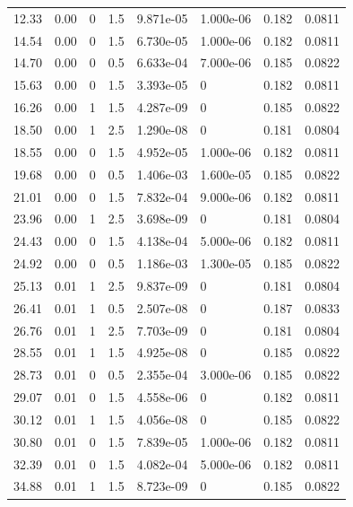 \documentclass[preview]{standalone}
\begin{document}
{{\begin{tabular}{L{1.2cm}C{1.2cm} C{0.3cm}C{0.5cm} C{1.4cm}C{1.4cm} C{1.4cm}C{1.4cm}}
  12.33  &  0.00  & 0     & 1.5 &  9.871e-05  & 1.000e-06  & 0.182 &  0.0811   \\ 
  14.54  &  0.00  & 0     & 1.5 &  6.730e-05  & 1.000e-06  & 0.182 &  0.0811   \\ 
  14.70  &  0.00  & 0     & 0.5 &  6.633e-04  & 7.000e-06  & 0.185 &  0.0822   \\ 
  15.63  &  0.00  & 0     & 1.5 &  3.393e-05  & 0  & 0.182 &  0.0811   \\ 
  16.26  &  0.00  & 1     & 1.5 &  4.287e-09  & 0  & 0.185 &  0.0822   \\ 
  18.50  &  0.00  & 1     & 2.5 &  1.290e-08  & 0  & 0.181 &  0.0804   \\ 
  18.55  &  0.00  & 0     & 1.5 &  4.952e-05  & 1.000e-06  & 0.182 &  0.0811   \\ 
  19.68  &  0.00  & 0     & 0.5 &  1.406e-03  & 1.600e-05  & 0.185 &  0.0822   \\ 
  21.01  &  0.00  & 0     & 1.5 &  7.832e-04  & 9.000e-06  & 0.182 &  0.0811   \\ 
  23.96  &  0.00  & 1     & 2.5 &  3.698e-09  & 0  & 0.181 &  0.0804   \\ 
  24.43  &  0.00  & 0     & 1.5 &  4.138e-04  & 5.000e-06  & 0.182 &  0.0811   \\ 
  24.92  &  0.00  & 0     & 0.5 &  1.186e-03  & 1.300e-05  & 0.185 &  0.0822   \\ 
  25.13  &  0.01  & 1     & 2.5 &  9.837e-09  & 0  & 0.181 &  0.0804   \\ 
  26.41  &  0.01  & 1     & 0.5 &  2.507e-08  & 0  & 0.187 &  0.0833   \\ 
  26.76  &  0.01  & 1     & 2.5 &  7.703e-09  & 0  & 0.181 &  0.0804   \\ 
  28.55  &  0.01  & 1     & 1.5 &  4.925e-08  & 0  & 0.185 &  0.0822   \\ 
  28.73  &  0.01  & 0     & 0.5 &  2.355e-04  & 3.000e-06  & 0.185 &  0.0822   \\ 
  29.07  &  0.01  & 0     & 1.5 &  4.558e-06  & 0  & 0.182 &  0.0811   \\ 
  30.12  &  0.01  & 1     & 1.5 &  4.056e-08  & 0  & 0.185 &  0.0822   \\ 
  30.80  &  0.01  & 0     & 1.5 &  7.839e-05  & 1.000e-06  & 0.182 &  0.0811   \\ 
  32.39  &  0.01  & 0     & 1.5 &  4.082e-04  & 5.000e-06  & 0.182 &  0.0811   \\ 
  34.88  &  0.01  & 1     & 1.5 &  8.723e-09  & 0  & 0.185 &  0.0822   \\ 

\end{tabular}}}
\end{document}
